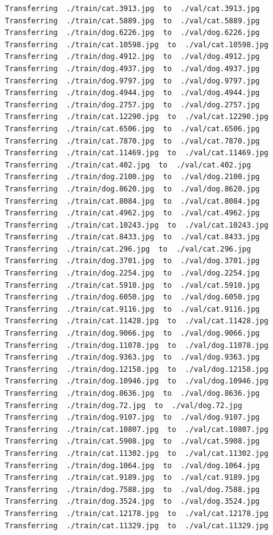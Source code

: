 \documentclass[]{book}
\theoremstyle{definition}
\theoremstyle{definition}
\theoremstyle{definition}
\theoremstyle{remark}
\begin{document}
\begin{verbatim}
Transferring  ./train/cat.3913.jpg  to  ./val/cat.3913.jpg
Transferring  ./train/cat.5889.jpg  to  ./val/cat.5889.jpg
Transferring  ./train/dog.6226.jpg  to  ./val/dog.6226.jpg
Transferring  ./train/cat.10598.jpg  to  ./val/cat.10598.jpg
Transferring  ./train/dog.4912.jpg  to  ./val/dog.4912.jpg
Transferring  ./train/dog.4937.jpg  to  ./val/dog.4937.jpg
Transferring  ./train/dog.9797.jpg  to  ./val/dog.9797.jpg
Transferring  ./train/dog.4944.jpg  to  ./val/dog.4944.jpg
Transferring  ./train/dog.2757.jpg  to  ./val/dog.2757.jpg
Transferring  ./train/cat.12290.jpg  to  ./val/cat.12290.jpg
Transferring  ./train/cat.6506.jpg  to  ./val/cat.6506.jpg
Transferring  ./train/cat.7870.jpg  to  ./val/cat.7870.jpg
Transferring  ./train/cat.11469.jpg  to  ./val/cat.11469.jpg
Transferring  ./train/cat.402.jpg  to  ./val/cat.402.jpg
Transferring  ./train/dog.2100.jpg  to  ./val/dog.2100.jpg
Transferring  ./train/dog.8620.jpg  to  ./val/dog.8620.jpg
Transferring  ./train/cat.8084.jpg  to  ./val/cat.8084.jpg
Transferring  ./train/cat.4962.jpg  to  ./val/cat.4962.jpg
Transferring  ./train/cat.10243.jpg  to  ./val/cat.10243.jpg
Transferring  ./train/cat.8433.jpg  to  ./val/cat.8433.jpg
Transferring  ./train/cat.296.jpg  to  ./val/cat.296.jpg
Transferring  ./train/dog.3701.jpg  to  ./val/dog.3701.jpg
Transferring  ./train/dog.2254.jpg  to  ./val/dog.2254.jpg
Transferring  ./train/cat.5910.jpg  to  ./val/cat.5910.jpg
Transferring  ./train/dog.6050.jpg  to  ./val/dog.6050.jpg
Transferring  ./train/cat.9116.jpg  to  ./val/cat.9116.jpg
Transferring  ./train/cat.11428.jpg  to  ./val/cat.11428.jpg
Transferring  ./train/dog.9066.jpg  to  ./val/dog.9066.jpg
Transferring  ./train/dog.11078.jpg  to  ./val/dog.11078.jpg
Transferring  ./train/dog.9363.jpg  to  ./val/dog.9363.jpg
Transferring  ./train/dog.12158.jpg  to  ./val/dog.12158.jpg
Transferring  ./train/dog.10946.jpg  to  ./val/dog.10946.jpg
Transferring  ./train/dog.8636.jpg  to  ./val/dog.8636.jpg
Transferring  ./train/dog.72.jpg  to  ./val/dog.72.jpg
Transferring  ./train/dog.9107.jpg  to  ./val/dog.9107.jpg
Transferring  ./train/cat.10807.jpg  to  ./val/cat.10807.jpg
Transferring  ./train/cat.5908.jpg  to  ./val/cat.5908.jpg
Transferring  ./train/cat.11302.jpg  to  ./val/cat.11302.jpg
Transferring  ./train/dog.1064.jpg  to  ./val/dog.1064.jpg
Transferring  ./train/cat.9189.jpg  to  ./val/cat.9189.jpg
Transferring  ./train/dog.7588.jpg  to  ./val/dog.7588.jpg
Transferring  ./train/dog.3524.jpg  to  ./val/dog.3524.jpg
Transferring  ./train/cat.12178.jpg  to  ./val/cat.12178.jpg
Transferring  ./train/cat.11329.jpg  to  ./val/cat.11329.jpg

\end{verbatim}
\end{document}
